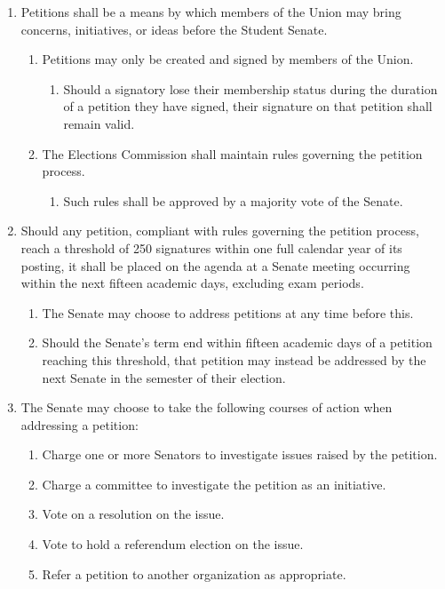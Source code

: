 
\begin{enumerate}
\item Petitions shall be a means by which members of the Union may bring concerns, initiatives, or ideas before the Student Senate.
  \begin{enumerate}
  \item Petitions may only be created and signed by members of the Union.
    \begin{enumerate}
    \item Should a signatory lose their membership status during the duration of a petition they have signed, their signature on that petition shall remain valid.
    \end{enumerate}
  \item The Elections Commission shall maintain rules governing the petition process.
    \begin{enumerate}
    \item Such rules shall be approved by a majority vote of the Senate.
    \end{enumerate}
  \end{enumerate}
\item Should any petition, compliant with rules governing the petition process, reach a threshold of 250 signatures within one full calendar year of its posting, it shall be placed on the agenda at a Senate meeting occurring within the next fifteen academic days, excluding exam periods.
  \begin{enumerate}
  \item The Senate may choose to address petitions at any time before this.
  \item Should the Senate’s term end within fifteen academic days of a petition reaching this threshold, that petition may instead be addressed by the next Senate in the semester of their election.
  \end{enumerate}
\item The Senate may choose to take the following courses of action when addressing a petition:
  \begin{enumerate}
  \item Charge one or more Senators to investigate issues raised by the petition.
  \item Charge a committee to investigate the petition as an initiative.
  \item Vote on a resolution on the issue.
  \item Vote to hold a referendum election on the issue.
  \item Refer a petition to another organization as appropriate.
  \end{enumerate}
\end{enumerate}

